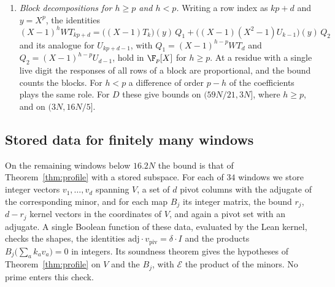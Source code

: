 \begin{enumerate}[label=(\roman*),wide]
fixed integer, the modulus of the cell, and the bound is the dimension of the slot space minus the number of
conditions. In the families C and $\mathrm C'$ the responses depend only on the residue of the column modulo
$p$, so that the filter costs $(p-q)_+$ conditions. In $\mathrm C'$, where $h\ge p$, one writes
$(X-1)^h=(X^p-1)(X-1)^{h-p}$, and the factor $(X-1)^{h-p}$ costs $h-p$ more. The family C gives bounds on $(58N/17,59N/17]$ and
$(29N/8,11N/3]$, and $\mathrm C'$ on $(16N/7,5N/2]$.
\item \emph{Block decompositions for $h\ge p$ and $h<p$.} Writing a row index as $kp+d$ and $y=X^p$, the
identities
\[
 (X-1)^hWT_{kp+d}=\bigl((X-1)T_k\bigr)(y)\,Q_1+\bigl((X-1)(X^2-1)U_{k-1}\bigr)(y)\,Q_2
\]
and its analogue for $U_{kp+d-1}$, with $Q_1=(X-1)^{h-p}WT_d$ and $Q_2=(X-1)^{h-p}U_{d-1}$, hold in $\F_p[X]$ for
$h\ge p$. At a residue with a single live digit the responses of all rows of a block are proportional, and the
bound counts the blocks. For $h<p$ a difference of order $p-h$ of the coefficients plays the same role.
For $D$ these give bounds on $(59N/21,3N]$, where $h\ge p$, and on $(3N,16N/5]$.
\end{enumerate}

\subsection{Stored data for finitely many windows}\label{ssec:packets}
On the remaining windows below $16.2N$ the bound is that of Theorem~\ref{thm:profile} with a stored
subspace. For each of $34$ windows we store integer vectors $v_1,\dots,v_d$ spanning $V$, a set of $d$ pivot
columns with the adjugate of the corresponding minor, and for each map $B_j$ its integer matrix, the bound
$r_j$, $d-r_j$ kernel vectors in the coordinates of $V$, and again a pivot set with an adjugate. A single
Boolean function of these data, evaluated by the Lean kernel, checks the shapes, the identities
$\mathrm{adj}\cdot v_{\mathrm{piv}}=\delta\cdot I$ and the products $B_j\bigl(\sum_ak_av_a\bigr)=0$ in
integers. Its soundness theorem gives the hypotheses of Theorem~\ref{thm:profile} on $V$ and the $B_j$, with
$\mathcal E$ the product of the minors. No prime enters this check.

